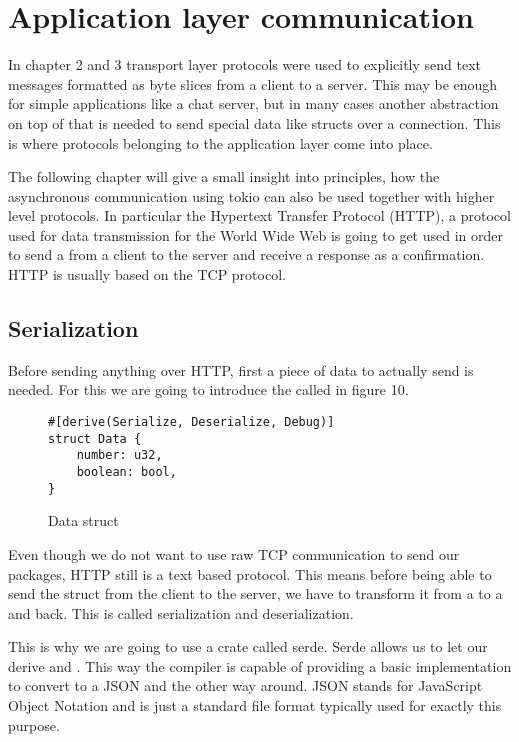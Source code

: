 
\section{Application layer communication}
In chapter 2 and 3 transport layer protocols were used to explicitly send text messages formatted as byte slices from a
client to a server. This may be enough for simple applications like a chat server, but in many cases another
abstraction on top of that is needed to send special data like structs over a connection. This is where protocols
belonging to the application layer come into place.

The following chapter will give a small insight into principles, how the asynchronous communication using tokio can
also be used together with higher level protocols. In particular the Hypertext Transfer Protocol (HTTP), a protocol
used for data transmission for the World Wide Web is going to get used in order to send a  from a client
to the server and receive a response as a confirmation. HTTP is usually based on the TCP protocol.

\subsection{Serialization}
Before sending anything over HTTP, first a piece of data to actually send is needed. For this we are going to introduce
the  called  in figure 10.

\begin{figure}[ht]
    \begin{verbatim}
#[derive(Serialize, Deserialize, Debug)]
struct Data {
    number: u32,
    boolean: bool,
}
    \end{verbatim}
    \caption{Data struct}
\end{figure}

Even though we do not want to use raw TCP communication to send our packages, HTTP still is a text based protocol. This
means before being able to send the struct from the client to the server, we have to transform it from a 
to a  and back. This is called serialization and deserialization.

This is why we are going to use a crate called serde. Serde allows us to let our  derive 
and . This way the compiler is capable of providing a basic implementation to convert  to
a JSON  and the other way around. JSON stands for JavaScript Object Notation and is just a standard file
format typically used for exactly this purpose.

